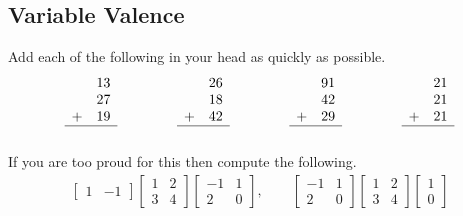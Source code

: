 \subsection{Variable Valence}
Add each of the following in your head as quickly as possible.
\begin{equation*}
\begin{array}{cc}
    & 13\\
    & 27\\
   + & 19\\
\hline\\
\end{array}
\hspace{1.5cm}
\begin{array}{cc}
    & 26\\
    & 18\\
  + & 42\\
\hline\\
\end{array}
\hspace{1.5cm}
\begin{array}{cc}
    & 91\\
    & 42\\
  + & 29\\
\hline\\
\end{array}
\hspace{1.5cm}
\begin{array}{cc}
    & 21\\
    & 21\\
  + & 21\\
\hline\\
\end{array}
\end{equation*}
If you are too proud for this then compute the following.
\begin{align*}
    \begin{bmatrix}
        1 & -1 
    \end{bmatrix}
    \begin{bmatrix}
        1 & 2 \\ 3 & 4 
    \end{bmatrix}
    \begin{bmatrix}
        -1 & 1 \\
        2 & 0
    \end{bmatrix},
    \qquad
    \begin{bmatrix}
        -1 & 1 \\
        2 & 0
    \end{bmatrix}
    \begin{bmatrix}
        1 & 2 \\ 3 & 4 
    \end{bmatrix}
    \begin{bmatrix}
        1 \\ 0 
    \end{bmatrix}
\end{align*}
